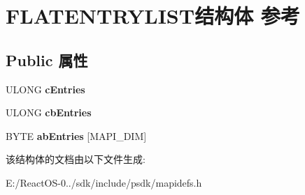 \hypertarget{struct_f_l_a_t_e_n_t_r_y_l_i_s_t}{}\section{F\+L\+A\+T\+E\+N\+T\+R\+Y\+L\+I\+S\+T结构体 参考}
\label{struct_f_l_a_t_e_n_t_r_y_l_i_s_t}
\subsection*{Public 属性}
\begin{DoxyCompactItemize}
\item 
\mbox{\label{struct_f_l_a_t_e_n_t_r_y_l_i_s_t_adca7e7f554cbd0137cca53a71e0e81a7}} 
U\+L\+O\+NG {\bfseries c\+Entries}
\item 
\mbox{\label{struct_f_l_a_t_e_n_t_r_y_l_i_s_t_adf1562945da2ecce5c22b2bf9a78e165}} 
U\+L\+O\+NG {\bfseries cb\+Entries}
\item 
\mbox{\label{struct_f_l_a_t_e_n_t_r_y_l_i_s_t_a6233ef82cd7f3bdfca0ae2b270df738c}} 
B\+Y\+TE {\bfseries ab\+Entries} \mbox{[}M\+A\+P\+I\+\_\+\+D\+IM\mbox{]}
\end{DoxyCompactItemize}


该结构体的文档由以下文件生成\+:\begin{DoxyCompactItemize}
\item 
E\+:/\+React\+O\+S-\/0../sdk/include/psdk/mapidefs.\+h\end{DoxyCompactItemize}
